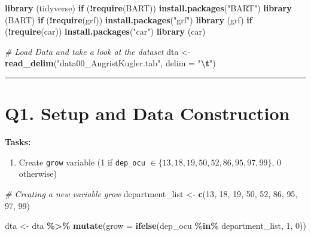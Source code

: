 \documentclass[
]{article}
\newenvironment{Shaded}{\begin{snugshade}}{\end{snugshade}}
\newcommand{\AttributeTok}[1]{\textcolor[rgb]{0.13,0.29,0.53}{#1}}
\newcommand{\CommentTok}[1]{\textcolor[rgb]{0.56,0.35,0.01}{\textit{#1}}}
\newcommand{\ControlFlowTok}[1]{\textcolor[rgb]{0.13,0.29,0.53}{\textbf{#1}}}
\newcommand{\DecValTok}[1]{\textcolor[rgb]{0.00,0.00,0.81}{#1}}
\newcommand{\FunctionTok}[1]{\textcolor[rgb]{0.13,0.29,0.53}{\textbf{#1}}}
\newcommand{\NormalTok}[1]{#1}
\newcommand{\OtherTok}[1]{\textcolor[rgb]{0.56,0.35,0.01}{#1}}
\newcommand{\SpecialCharTok}[1]{\textcolor[rgb]{0.81,0.36,0.00}{\textbf{#1}}}
\newcommand{\StringTok}[1]{\textcolor[rgb]{0.31,0.60,0.02}{#1}}
\providecommand{\tightlist}{%
  \setlength{\itemsep}{0pt}\setlength{\parskip}{0pt}}
\begin{document}
\begin{Shaded}
\begin{Highlighting}[]
\FunctionTok{library}\NormalTok{ (tidyverse)}
\ControlFlowTok{if}\NormalTok{ (}\SpecialCharTok{!}\FunctionTok{require}\NormalTok{(BART)) }\FunctionTok{install.packages}\NormalTok{(}\StringTok{"BART"}\NormalTok{)}
\FunctionTok{library}\NormalTok{ (BART)}
\ControlFlowTok{if}\NormalTok{ (}\SpecialCharTok{!}\FunctionTok{require}\NormalTok{(grf)) }\FunctionTok{install.packages}\NormalTok{(}\StringTok{"grf"}\NormalTok{)}
\FunctionTok{library}\NormalTok{ (grf)}
\ControlFlowTok{if}\NormalTok{ (}\SpecialCharTok{!}\FunctionTok{require}\NormalTok{(car)) }\FunctionTok{install.packages}\NormalTok{(}\StringTok{"car"}\NormalTok{)}
\FunctionTok{library}\NormalTok{ (car)}


\CommentTok{\# Load Data and take a look at the dataset}
\NormalTok{dta }\OtherTok{\textless{}{-}} \FunctionTok{read\_delim}\NormalTok{(}\StringTok{"data00\_AngristKugler.tab"}\NormalTok{, }\AttributeTok{delim =} \StringTok{"}\SpecialCharTok{\textbackslash{}t}\StringTok{"}\NormalTok{)}
\end{Highlighting}
\end{Shaded}

\begin{center}\rule{0.5\linewidth}{0.5pt}\end{center}

\section{Q1. Setup and Data
Construction}\label{q1.-setup-and-data-construction}

\textbf{Tasks:}

\begin{enumerate}
\def\labelenumi{\arabic{enumi}.}
\tightlist
\item
  Create \texttt{grow} variable (1 if \texttt{dep\_ocu}
  \(\in \{13, 18, 19, 50, 52, 86, 95, 97, 99\}\), 0 otherwise)
\end{enumerate}

\begin{Shaded}
\begin{Highlighting}[]
\CommentTok{\# Creating a new variable grow}
\NormalTok{department\_list }\OtherTok{\textless{}{-}} \FunctionTok{c}\NormalTok{(}\DecValTok{13}\NormalTok{, }\DecValTok{18}\NormalTok{, }\DecValTok{19}\NormalTok{, }\DecValTok{50}\NormalTok{, }\DecValTok{52}\NormalTok{, }\DecValTok{86}\NormalTok{, }\DecValTok{95}\NormalTok{, }\DecValTok{97}\NormalTok{, }\DecValTok{99}\NormalTok{)}

\NormalTok{dta }\OtherTok{\textless{}{-}}\NormalTok{ dta }\SpecialCharTok{\%\textgreater{}\%} 
  \FunctionTok{mutate}\NormalTok{(}\AttributeTok{grow =} \FunctionTok{ifelse}\NormalTok{(dep\_ocu }\SpecialCharTok{\%in\%}\NormalTok{ department\_list, }\DecValTok{1}\NormalTok{, }\DecValTok{0}\NormalTok{))}
\end{Highlighting}
\end{Shaded}
\end{document}
